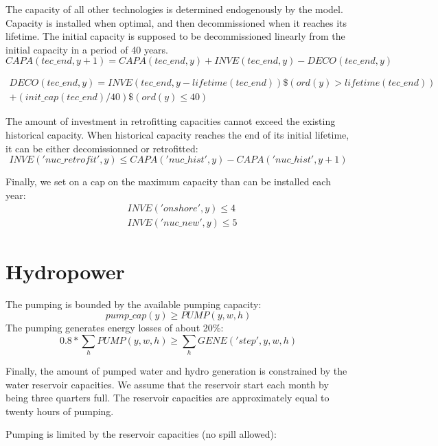 \documentclass[authoryear]{elsarticle}
\begin{document}
The capacity of all other technologies is determined endogenously by the model. Capacity is installed when optimal, and then decommissioned when it reaches its lifetime. The initial capacity is supposed to be decommissioned linearly from the initial capacity in a period of 40 years.
\begin{equation}
CAPA(tec\_end,y+1) = CAPA(tec\_end,y) + INVE(tec\_end,y) - DECO(tec\_end,y)
\end{equation}

\begin{multline}
DECO(tec\_end,y) = INVE(tec\_end,y-lifetime(tec\_end))\$(ord(y)>lifetime(tec\_end)) \\ + (init\_cap(tec\_end)/40)\$(ord(y) \leq 40)
\end{multline}

The amount of investment in retrofitting capacities cannot exceed the existing historical capacity. When historical capacity reaches the end of its initial lifetime, it can be either decomissionned or retrofitted:
\begin{equation}
INVE('nuc\_retrofit',y) \leq CAPA('nuc\_hist',y) - CAPA('nuc\_hist',y+1)
\end{equation}

Finally, we set on a cap on the maximum capacity than can be installed each year:
\begin{align}
& INVE('onshore',y) \leq  4 \\
& INVE('nuc\_new',y) \leq  5
\end{align}


\section{Hydropower}

The pumping is bounded by the available pumping capacity:
\begin{equation}
pump\_cap(y) \geq  PUMP(y,w,h)
\end{equation}
The pumping generates energy losses of about 20\%:
\begin{equation}
0.8*\sum_h PUMP(y,w,h) \geq \sum_h GENE('step',y,w,h)
\end{equation}

Finally, the amount of pumped water and hydro generation is constrained by the water reservoir capacities. We assume that the reservoir start each month by being three quarters full.
The reservoir capacities are approximately equal to twenty hours of pumping.

Pumping is limited by the reservoir capacities (no spill allowed):
\end{document}
